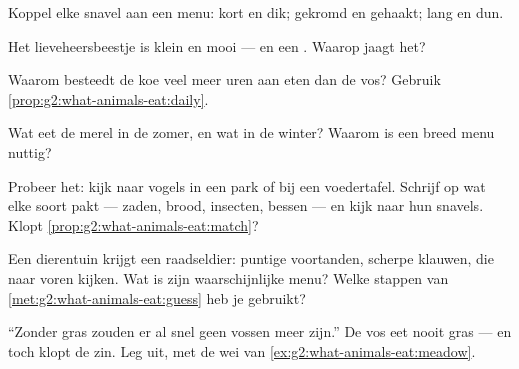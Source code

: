 \begin{exercise}[$\star$]\label{exo:g2:what-animals-eat:4}
Koppel elke snavel aan een menu: kort en dik; gekromd en gehaakt; lang
en dun.
\end{exercise}

\begin{exercise}[$\star$]\label{exo:g2:what-animals-eat:5}
Het lieveheersbeestje is klein en mooi --- en een . Waarop
jaagt het?
\end{exercise}

\begin{exercise}[$\star$]\label{exo:g2:what-animals-eat:6}
Waarom besteedt de koe veel meer uren aan eten dan de vos? Gebruik
\cref{prop:g2:what-animals-eat:daily}.
\end{exercise}

\begin{exercise}[$\star$]\label{exo:g2:what-animals-eat:7}
Wat eet de merel in de zomer, en wat in de winter? Waarom is een breed
menu nuttig?
\end{exercise}

\begin{exercise}[$\star$]\label{exo:g2:what-animals-eat:8}
Probeer het: kijk naar vogels in een park of bij een voedertafel.
Schrijf op wat elke soort pakt --- zaden, brood, insecten, bessen ---
en kijk naar hun snavels. Klopt \cref{prop:g2:what-animals-eat:match}?
\end{exercise}

\begin{exercise}[$\star\star$]\label{exo:g2:what-animals-eat:9}
Een dierentuin krijgt een raadseldier: puntige voortanden, scherpe
klauwen,  die naar voren kijken. Wat is zijn waarschijnlijke menu?
Welke stappen van \cref{met:g2:what-animals-eat:guess} heb je gebruikt?
\end{exercise}

\begin{exercise}[$\star\star$]\label{exo:g2:what-animals-eat:10}
``Zonder gras zouden er al snel geen vossen meer zijn.'' De vos eet
nooit gras --- en toch klopt de zin. Leg uit, met de wei van
\cref{ex:g2:what-animals-eat:meadow}.
\end{exercise}
